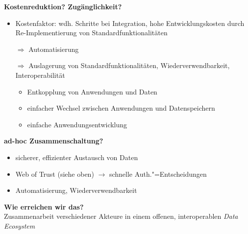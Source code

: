 \textbf{Kostenreduktion? Zugänglichkeit?}
\begin{itemize}
    \item Kostenfaktor: wdh. Schritte bei Integration, hohe Entwicklungskosten durch Re-Implementierung von Standardfunktionalitäten
    \item[$\Rightarrow$] Automatisierung
    \item[$\Rightarrow$] Auslagerung von Standardfunktionalitäten, Wiederverwendbarkeit, Interoperabilität
    \begin{itemize}
        \item Entkopplung von Anwendungen und Daten
        \item einfacher Wechsel zwischen Anwendungen und Datenspeichern
        \item einfache Anwendungsentwicklung
    \end{itemize}
\end{itemize}

\vspace{1em}

\textbf{ad-hoc Zusammenschaltung?}
\begin{itemize}
    \item sicherer, effizienter Austausch von Daten
    \item Web of Trust (siehe oben) $\to$ schnelle Auth."=Entscheidungen
    \item Automatisierung, Wiederverwendbarkeit
\end{itemize}

\vspace{1em}

\textbf{Wie erreichen wir das?}\\
Zusammenarbeit verschiedener Akteure in einem offenen, interoperablen \emph{Data Ecosystem}
